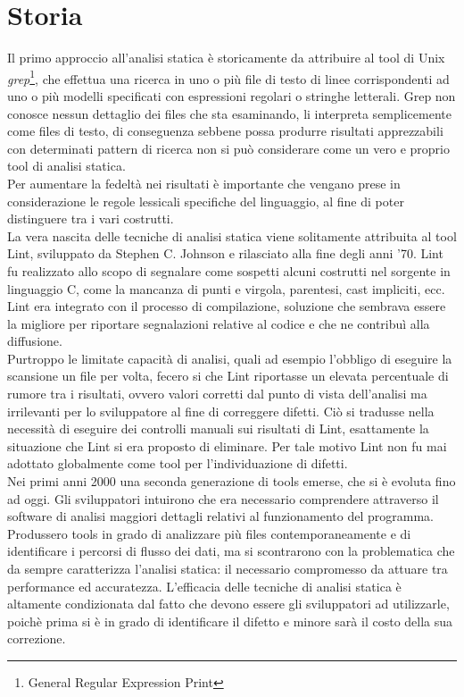 \section{Storia}
Il primo approccio all'analisi statica è storicamente da attribuire al tool di Unix \emph{grep}\footnote{General Regular Expression Print}, che effettua una ricerca in uno o più file di testo di linee corrispondenti ad uno o più modelli specificati con espressioni regolari o stringhe letterali.
Grep non conosce nessun dettaglio dei files che sta esaminando, li interpreta semplicemente come files di testo, di conseguenza sebbene possa produrre risultati apprezzabili con determinati pattern di ricerca non si può considerare come un vero e proprio tool di analisi statica. \\
Per aumentare la fedeltà nei risultati è importante che vengano prese in considerazione le regole lessicali specifiche del linguaggio, al fine di poter distinguere tra i vari costrutti.\\  
La vera nascita delle tecniche di analisi statica viene solitamente attribuita al tool Lint, sviluppato da Stephen C. Johnson e rilasciato alla fine degli anni '70. Lint fu realizzato allo scopo di segnalare come sospetti alcuni costrutti nel sorgente in linguaggio C, come la mancanza di punti e virgola, parentesi, cast impliciti, ecc. 
Lint era integrato con il processo di compilazione, soluzione che sembrava essere la migliore per riportare segnalazioni relative al codice e che ne contribuì alla diffusione.\\
Purtroppo le limitate capacità di analisi, quali ad esempio l'obbligo di eseguire la scansione un file per volta, fecero si che Lint riportasse un elevata percentuale di rumore tra i risultati, ovvero valori corretti dal punto di vista dell'analisi ma irrilevanti per lo sviluppatore al fine di correggere difetti. Ciò si tradusse nella necessità di eseguire dei controlli manuali sui risultati di Lint, esattamente la situazione che Lint si era proposto di eliminare.
Per tale motivo Lint non fu mai adottato globalmente come tool per l'individuazione di difetti.\\
Nei primi anni 2000 una seconda generazione di tools emerse, che si è evoluta fino ad oggi. Gli sviluppatori intuirono che era necessario comprendere attraverso il software di analisi maggiori dettagli relativi al funzionamento del programma. Produssero tools in grado di  analizzare più files contemporaneamente e di identificare i percorsi di flusso dei dati, ma si scontrarono con la problematica che da sempre caratterizza l'analisi statica: il necessario compromesso da attuare tra performance ed accuratezza. L'efficacia delle tecniche di analisi statica è altamente condizionata dal fatto che devono essere gli sviluppatori ad utilizzarle, poichè prima si è in grado di identificare il difetto e minore sarà il costo della sua correzione.

